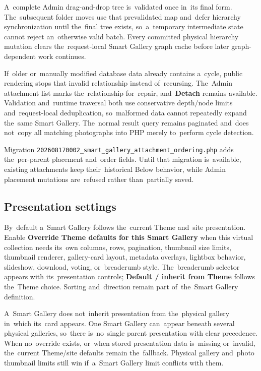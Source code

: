 \documentclass[11pt,a4paper]{article}
\newcommand{\ui}[1]{\textbf{#1}}
\begin{document}
A~complete Admin drag-and-drop tree is~validated once in~its final form.
The~subsequent folder moves use that prevalidated map and~defer hierarchy
synchronization until the~final tree exists, so~a~temporary intermediate state
cannot reject an~otherwise valid batch. Every committed physical hierarchy
mutation clears the~request-local Smart Gallery graph cache before later
graph-dependent work continues.

If~older or~manually modified database data already contains a~cycle, public
rendering stops that invalid relationship instead of~recursing. The~Admin
attachment list marks the~relationship for~repair, and~\ui{Detach} remains
available. Validation and~runtime traversal both use conservative depth/node
limits and~request-local deduplication, so~malformed data cannot repeatedly
expand the~same Smart Gallery. The~normal result query remains paginated
and~does not~copy all matching photographs into PHP merely to~perform cycle
detection.

Migration \texttt{202608170002\_smart\_gallery\_attachment\_ordering.php} adds
the~per-parent placement and~order fields. Until that migration is~available,
existing attachments keep their~historical Below behavior, while Admin placement
mutations are~refused rather than~partially saved.

\subsection{Presentation settings}

By~default a~Smart Gallery follows the~current Theme and~site presentation.
Enable \ui{Override Theme defaults for this Smart Gallery} when this virtual
collection needs its~own columns, rows, pagination, thumbnail size limits,
thumbnail renderer, gallery-card layout, metadata overlays, lightbox behavior,
slideshow, download, voting, or~breadcrumb style. The~breadcrumb selector
appears with its~presentation controls; \ui{Default / inherit from Theme}
follows the~Theme choice. Sorting and~direction remain part of~the~Smart Gallery
definition.

A~Smart Gallery does not~inherit presentation from the~physical gallery in~which
its~card appears. One Smart Gallery can~appear beneath several physical
galleries, so~there is~no~single parent presentation with clear precedence. When
no~override exists, or~when stored presentation data is~missing or~invalid,
the~current Theme/site defaults remain the~fallback. Physical gallery and~photo
thumbnail limits still win if~a~Smart Gallery limit conflicts with them.
\end{document}
